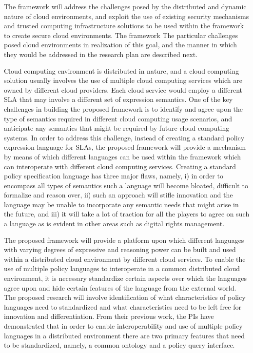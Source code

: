 \documentclass[times, 10pt,twocolumn]{article}
\begin{document}
The framework will address the challenges posed by the distributed and dynamic nature of cloud environments, and exploit the use of existing security mechanisms and trusted computing infrastructure solutions to be used within the framework to create secure cloud environments. The framework The particular challenges posed cloud environments in realization of this goal, and the manner in which they would be addressed in the research plan are described next.

Cloud computing environment is distributed in nature, and a cloud computing solution usually involves the use of multiple cloud computing services which are owned by different cloud providers. Each cloud service would employ a different SLA that may involve a different set of expression semantics. One of the key challenges in building the proposed framework is to identify and agree upon the type of semantics required in different cloud computing usage scenarios, and anticipate any semantics that might be required by future cloud computing systems. In order to address this challenge, instead of creating a standard policy expression language for SLAs, the proposed framework will provide a mechanism by means of which different languages can be used within the framework which can interoperate with different cloud computing services. Creating a standard policy specification language has three major flaws, namely, i)  in order to encompass all types of semantics such a language will become bloated, difficult to formalize and reason over, ii) such an approach will stifle innovation and  the language may be unable to incorporate any semantic needs that might arise in the future, and iii) it will take a lot of traction for all the players to agree on such a language as is evident in other areas such as digital rights management.

The proposed framework will provide a platform upon which different languages with varying degrees of expressive and reasoning power can be built and used within a distributed cloud environment by different cloud services.  To enable the use of multiple policy languages to interoperate in a common distributed cloud environment, it is necessary standardize certain aspects over which the languages agree upon and hide certain features of the language from the external world. The proposed research will involve identification of what characteristics of policy languages need to standardized and what characteristics need to be left free for innovation and differentiation. From their previous work, the PIs have demonstrated that in order to enable interoperability and use of multiple policy languages in a distributed environment there are two primary features that need to be standardized, namely, a common ontology and a policy query interface.
\end{document}
